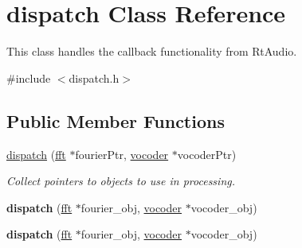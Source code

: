 \hypertarget{classdispatch}{\section{dispatch Class Reference}
\label{classdispatch}
}


This class handles the callback functionality from Rt\-Audio.  




{\ttfamily \#include $<$dispatch.\-h$>$}

\subsection*{Public Member Functions}
\begin{DoxyCompactItemize}
\item 
\hypertarget{classdispatch_a641ec1136a8fdecb8b9ab51fa672a848}{\hyperlink{classdispatch_a641ec1136a8fdecb8b9ab51fa672a848}{dispatch} (\hyperlink{classfft}{fft} $\ast$fourier\-Ptr, \hyperlink{classvocoder}{vocoder} $\ast$vocoder\-Ptr)}\label{classdispatch_a641ec1136a8fdecb8b9ab51fa672a848}

\begin{DoxyCompactList}\small\item\em Collect pointers to objects to use in processing. \end{DoxyCompactList}\item 
\hypertarget{classdispatch_a49638cdbc0fee44e411973f09fc64d83}{{\bfseries dispatch} (\hyperlink{classfft}{fft} $\ast$fourier\-\_\-obj, \hyperlink{classvocoder}{vocoder} $\ast$vocoder\-\_\-obj)}\label{classdispatch_a49638cdbc0fee44e411973f09fc64d83}

\item 
\hypertarget{classdispatch_a49638cdbc0fee44e411973f09fc64d83}{{\bfseries dispatch} (\hyperlink{classfft}{fft} $\ast$fourier\-\_\-obj, \hyperlink{classvocoder}{vocoder} $\ast$vocoder\-\_\-obj)}\label{classdispatch_a49638cdbc0fee44e411973f09fc64d83}

\end{DoxyCompactItemize}
